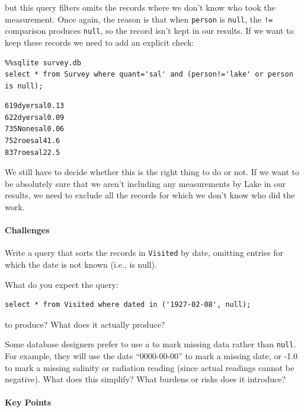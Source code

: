 \documentclass{book}
\begin{document}
but this query filters omits the records where we don't know who took
the measurement. Once again, the reason is that when \texttt{person} is
\texttt{null}, the \texttt{!=} comparison produces \texttt{null}, so the
record isn't kept in our results. If we want to keep these records we
need to add an explicit check:

\begin{verbatim}
%%sqlite survey.db
select * from Survey where quant='sal' and (person!='lake' or person is null);
\end{verbatim}

\begin{verbatim}
619dyersal0.13
622dyersal0.09
735Nonesal0.06
752roesal41.6
837roesal22.5
\end{verbatim}

We still have to decide whether this is the right thing to do or not. If
we want to be absolutely sure that we aren't including any measurements
by Lake in our results, we need to exclude all the records for which we
don't know who did the work.

\mbox{}\paragraph{Challenges}

\begin{swcenumerate}
\item
  Write a query that sorts the records in \texttt{Visited} by date,
  omitting entries for which the date is not known (i.e., is null).
\item
  What do you expect the query:

\begin{verbatim}
select * from Visited where dated in ('1927-02-08', null);
\end{verbatim}

  to produce? What does it actually produce?
\item
  Some database designers prefer to use a
   to mark missing data
  rather than \texttt{null}. For example, they will use the date
  ``0000-00-00'' to mark a missing date, or -1.0 to mark a missing
  salinity or radiation reading (since actual readings cannot be
  negative). What does this simplify? What burdens or risks does it
  introduce?
\end{swcenumerate}

\mbox{}\paragraph{Key Points}
\end{document}
